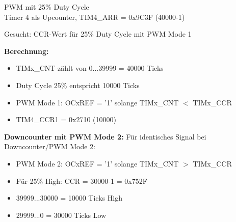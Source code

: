 \begin{example2}{PWM mit 25\% Duty Cycle}\\
    Timer 4 als Upcounter, TIM4\_ARR = 0x9C3F (40000-1)
    
    Gesucht: CCR-Wert für 25\% Duty Cycle mit PWM Mode 1
    
    \tcblower
    
    \textbf{Berechnung:}
    \begin{itemize}
        \item TIMx\_CNT zählt von 0...39999 = 40000 Ticks
        \item Duty Cycle 25\% entspricht 10000 Ticks
        \item PWM Mode 1: OCxREF = '1' solange TIMx\_CNT $<$ TIMx\_CCR
        \item TIM4\_CCR1 = 0x2710 (10000)
    \end{itemize}
    
    \textbf{Downcounter mit PWM Mode 2:}
    Für identisches Signal bei Downcounter/PWM Mode 2:
    \begin{itemize}
        \item PWM Mode 2: OCxREF = '1' solange TIMx\_CNT $>$ TIMx\_CCR
        \item Für 25\% High: CCR = 30000-1 = 0x752F
        \item 39999...30000 = 10000 Ticks High
        \item 29999...0 = 30000 Ticks Low
    \end{itemize}
\end{example2}

